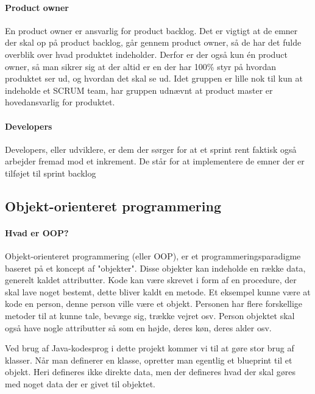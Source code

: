 \paragraph{Product owner}
En product owner er ansvarlig for product backlog. Det er vigtigt at de emner der skal op på product backlog, går gennem product owner, så de har det fulde overblik over hvad produktet indeholder. Derfor er der også kun én product owner, så man sikrer sig at der altid er en der har 100\% styr på hvordan produktet ser ud, og hvordan det skal se ud. Idet gruppen er lille nok til kun at indeholde et SCRUM team, har gruppen udnævnt at product master er hovedansvarlig for produktet. 

\paragraph{Developers}
Developers, eller udviklere, er dem der sørger for at et sprint rent faktisk også arbejder fremad mod et inkrement. De står for at implementere de emner der er tilføjet til sprint backlog

\subsection{Objekt-orienteret programmering}
\paragraph{Hvad er OOP?}
Objekt-orienteret programmering (eller OOP), er et programmeringsparadigme baseret på et koncept af "objekter". Disse objekter kan indeholde en række data, generelt kaldet attributter. Kode kan være skrevet i form af en procedure, der skal lave noget bestemt, dette bliver kaldt en metode. Et eksempel kunne være at kode en person, denne person ville være et objekt. Personen har flere forskellige metoder til at kunne tale, bevæge sig, trække vejret osv. Person objektet skal også have nogle attributter så som en højde, deres køn, deres alder osv. 

Ved brug af Java-kodesprog i dette projekt kommer vi til at gøre stor brug af klasser. Når man definerer en klasse, opretter man egentlig et blueprint til et objekt. Heri defineres ikke direkte data, men der defineres hvad der skal gøres med noget data der er givet til objektet.

